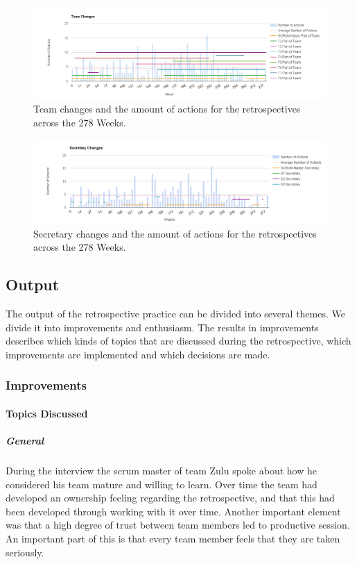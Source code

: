 \begin{figure}
	\centering
	\includegraphics[width=\textwidth, keepaspectratio]{figures/team-changes.png}
	\caption{Team changes and the amount of actions for the retrospectives across the 278 Weeks.}
	\label{figure:team-changes}
\end{figure}

\begin{figure}
	\centering
	\includegraphics[width=\textwidth, keepaspectratio]{figures/secretary-changes.png}
	\caption{Secretary changes and the amount of actions for the retrospectives across the 278 Weeks.}
	\label{figure:secretary-changes}
\end{figure}
\afterpage{\clearpage}

\subsection{Output}
The output of the retrospective practice can be divided into several themes. We divide it into improvements and enthusiasm. The results in improvements describes which kinds of topics that are discussed during the retrospective, which improvements are implemented and which decisions are made. 

\subsubsection{Improvements}
\paragraph{Topics Discussed}

\subparagraph{General}
During the interview the scrum master of team Zulu spoke about how he considered his team mature and willing to learn. Over time the team had developed an ownership feeling regarding the retrospective, and that this had been developed through working with it over time. Another important element was that a high degree of trust between team members led to productive session. An important part of this is that every team member feels that they are taken seriously. 

